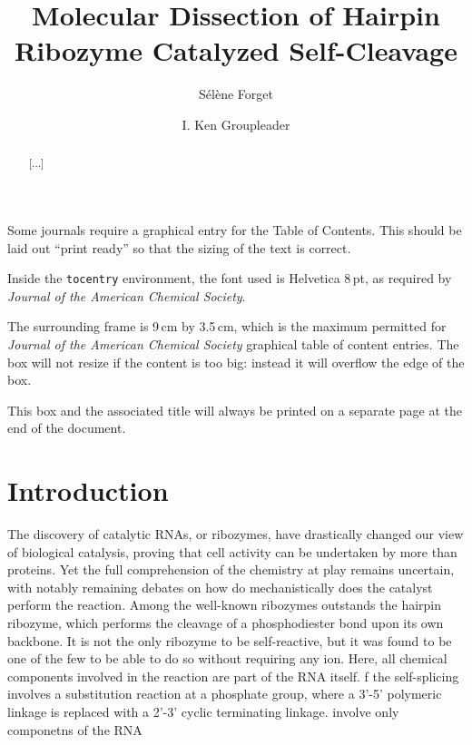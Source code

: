 \documentclass[journal=jacsat,manuscript=article]{achemso}
\author{Sélène Forget}
\affiliation[ENS]
{CPCV, Département de Chimie, École Normale Supérieure, PSL University, Sorbonne University, CNRS, 75005 Paris}
\author{I. Ken Groupleader}
\affiliation[ENS]
{CPCV, Département de Chimie, École Normale Supérieure, PSL University, Sorbonne University, CNRS, 75005 Paris}
\title[An \textsf{achemso} demo]
  {Molecular Dissection of Hairpin Ribozyme Catalyzed Self-Cleavage}
\begin{document}
\begin{tocentry}

Some journals require a graphical entry for the Table of Contents.
This should be laid out ``print ready'' so that the sizing of the
text is correct.

Inside the \texttt{tocentry} environment, the font used is Helvetica
8\,pt, as required by \emph{Journal of the American Chemical
Society}.

The surrounding frame is 9\,cm by 3.5\,cm, which is the maximum
permitted for  \emph{Journal of the American Chemical Society}
graphical table of content entries. The box will not resize if the
content is too big: instead it will overflow the edge of the box.

This box and the associated title will always be printed on a
separate page at the end of the document.

\end{tocentry}

\begin{abstract}
  [...]
\end{abstract}

\section{Introduction}
The discovery of catalytic RNAs, or ribozymes, have drastically changed our view of biological catalysis, proving that cell activity can be undertaken by more than proteins. Yet the full comprehension of the chemistry at play remains uncertain, with notably remaining debates on how do mechanistically does the catalyst perform the reaction. Among the well-known ribozymes outstands the hairpin ribozyme, which performs the cleavage of a phosphodiester bond upon its own backbone. 
It is not the only ribozyme to be self-reactive, but it was found to be one of the few to be able to do so without requiring any ion. 
Here, all chemical components involved in the reaction are part of the RNA itself.  f the self-splicing involves a substitution reaction at a phosphate group, 
where a 3'-5' polymeric linkage is replaced with a 2'-3' cyclic terminating linkage. involve only componetns of the RNA 
\end{document}

